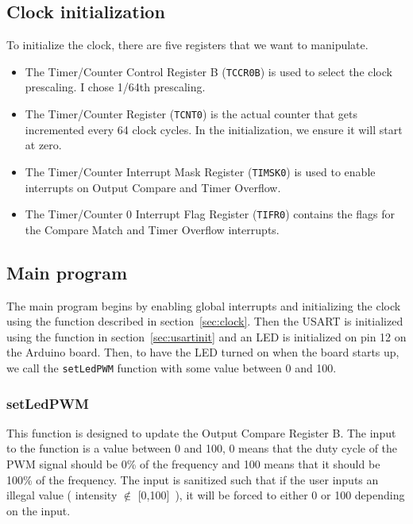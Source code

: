 \documentclass[11pt,a4paper,titlepage]{article}
\begin{document}
	\subsection{Clock initialization \label{sec:clock}}
	To initialize the clock, there are five registers that we want to manipulate.
	\begin{itemize}
		\item The Timer/Counter Control Register B (\verb|TCCR0B|) is used to select the clock prescaling. I chose 1/64th prescaling.
		
		
		\item The Timer/Counter Register (\verb|TCNT0|) is the actual counter that gets incremented every 64 clock cycles. In the initialization, we ensure it will start at zero.
		
		
		\item The Timer/Counter Interrupt Mask Register (\verb|TIMSK0|) is used to enable interrupts on Output Compare and Timer Overflow.
		
		
		\item The Timer/Counter 0 Interrupt Flag Register (\verb|TIFR0|) contains the flags for the Compare Match and Timer Overflow interrupts.
		
	\end{itemize}
	
	\subsection{Main program}
	The main program begins by enabling global interrupts and initializing the clock using the function described in section~\ref{sec:clock}. Then the USART is initialized using the function in section~\ref{sec:usartinit} and an LED is initialized on pin 12 on the Arduino board. Then, to have the LED turned on when the board starts up, we call the \verb|setLedPWM| function with some value between 0 and 100.
	
	
	
	\subsubsection{setLedPWM}
	This function is designed to update the Output Compare Register B. The input to the function is a value between 0 and 100, 0 means that the duty cycle of the PWM signal should be 0\% of the frequency and 100 means that it should be 100\% of the frequency. The input is sanitized such that if the user inputs an illegal value ( intensity $\notin$ [0,100]~), it will be forced to either 0 or 100 depending on the input.
	
\end{document}
